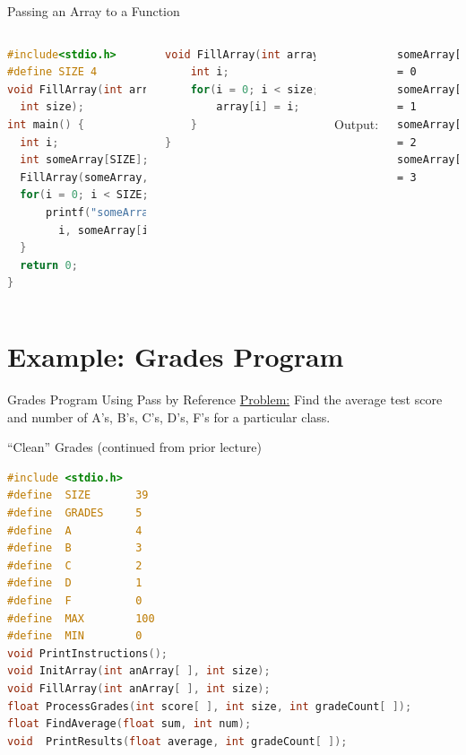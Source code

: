 \documentclass[graphics]{beamer}
\begin{document}
\begin{frame}[fragile]{Passing an Array to a Function}
    \begin{columns}
        \column[t]{5cm}
            \begin{lstlisting}[language=C,basicstyle=\scriptsize,keywordstyle=\color{blue},commentstyle=\color{green},showstringspaces=false,stringstyle=\color{red},tabsize=2]
#include<stdio.h>
#define SIZE 4
void FillArray(int array[],
  int size);
int main() {
  int i;
  int someArray[SIZE];
  FillArray(someArray, SIZE);
  for(i = 0; i < SIZE; i++) {
      printf("someArray[%d] = %d\n",
        i, someArray[i]);
  }
  return 0;
}
            \end{lstlisting}
        \column[t]{6cm}
            \begin{lstlisting}[language=C,basicstyle=\scriptsize,keywordstyle=\color{blue},commentstyle=\color{green},showstringspaces=false,stringstyle=\color{red}]
void FillArray(int array[], int size) {
    int i;
    for(i = 0; i < size; i++) {
        array[i] = i;
    }
}
            \end{lstlisting}
            ~~ \\ ~~ \\ ~~ \\ ~~ \\ Output:
            \footnotesize
            \begin{verbatim}
someArray[0] = 0
someArray[1] = 1
someArray[2] = 2
someArray[3] = 3
            \end{verbatim}
    \end{columns}
\end{frame}

\section{Example: Grades Program}
\begin{frame}{Grades Program Using Pass by Reference}
    \underline{Problem:} Find the average test score and number of A's, B's, C's, D's, F's for a particular class.
\end{frame}

\begin{frame}[fragile]{``Clean'' Grades (continued from prior lecture)}
    \begin{lstlisting}[language=C,basicstyle=\scriptsize,keywordstyle=\color{blue},commentstyle=\color{green},showstringspaces=false,stringstyle=\color{red}]
#include <stdio.h>
#define  SIZE       39
#define  GRADES     5
#define  A          4
#define  B          3
#define  C          2
#define  D          1
#define  F          0
#define  MAX        100
#define  MIN        0
void PrintInstructions();
void InitArray(int anArray[ ], int size);
void FillArray(int anArray[ ], int size);
float ProcessGrades(int score[ ], int size, int gradeCount[ ]);
float FindAverage(float sum, int num);
void  PrintResults(float average, int gradeCount[ ]);
    \end{lstlisting}
\end{frame}
\end{document}

